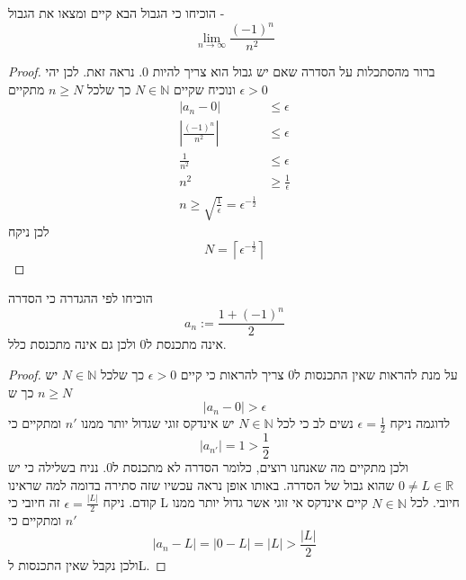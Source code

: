 \documentclass{article}
\begin{document}
\begin{exercise}
הוכיחו כי הגבול הבא קיים ומצאו את הגבול - 
\[\underset{n\rightarrow\infty}{\lim} \frac{(-1)^n }{n^2}\]
\end{exercise}

\begin{proof}
ברור מהסתכלות על הסדרה שאם יש גבול הוא צריך להיות 0. נראה זאת. לכן יהי 
$\epsilon>0$
ונוכיח שקיים 
$N\in\mathbb{N}$
כך שלכל 
$n\geq N$
מתקיים 
\begin{align*}
|a_n-0|&\leq\epsilon \\
\left|\frac{(-1)^n}{n^2}\right|&\leq \epsilon \\
\frac{1}{n^2}&\leq\epsilon \\
n^2&\geq \frac{1}{\epsilon} \\
n\geq \sqrt{\frac{1}{\epsilon}} = \epsilon^{-\frac{1}{2}}
\end{align*}
לכן ניקח 
\[N = \left\lceil \epsilon^{-\frac{1}{2}}\right\rceil\]
\end{proof}

\begin{exercise}
הוכיחו לפי ההגדרה כי הסדרה 
\[a_n:=\frac{1+(-1)^n}{2}\]
אינה מתכנסת ל0 ולכן גם אינה מתכנסת כלל.
\end{exercise}

\begin{proof}
על מנת להראות שאין התכנסות ל0 צריך להראות כי קיים 
$\epsilon>0$
כך שלכל 
$N\in\mathbb{N}$
יש 
$n\geq N$
כך ש 
\[|a_n-0|>\epsilon\]
לדוגמה ניקח 
$\epsilon = \frac{1}{2}$
נשים לב כי לכל 
$N\in\mathbb{N}$
יש אינדקס זוגי שגדול יותר ממנו 
$n'$
ומתקיים כי
\[|a_{n'}| = 1>\frac{1}{2}\]
ולכן מתקיים מה שאנחנו רוצים, כלומר הסדרה לא מתכנסת ל0. נניח בשלילה כי יש 
$0\neq L\in\mathbb{R}$
שהוא גבול של הסדרה. באותו אופן נראה עכשיו שזה סתירה בדומה למה שראינו קודם. ניקח 
$\epsilon=\frac{|L|}{2}$ 
זה חיובי כי L חיובי. לכל 
$N\in\mathbb{N}$
קיים אינדקס אי זוגי אשר גדול יותר ממנו 
$n'$
ומתקיים כי
\[|a_n - L| = |0-L| = |L|> \frac{|L|}{2}\]
ולכן נקבל שאין התכנסות לL. 
\end{proof}
\end{document}
